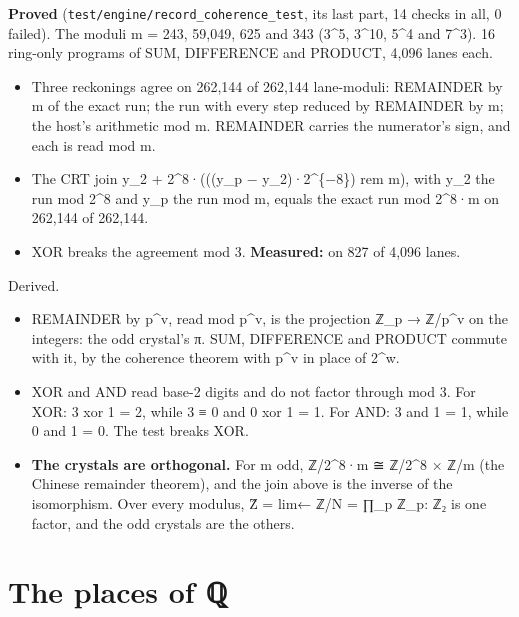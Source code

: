\textbf{Proved} (\texttt{test/\allowbreak{}engine/\allowbreak{}record\_\allowbreak{}coherence\_\allowbreak{}test}, its last part, 14 checks in all, 0 failed). The moduli m = 243, 59,049, 625 and 343 (3\textasciicircum{}5, 3\textasciicircum{}10, 5\textasciicircum{}4 and 7\textasciicircum{}3). 16 ring-only programs of SUM, DIFFERENCE and PRODUCT, 4,096 lanes each.

\begin{itemize}
\item Three reckonings agree on 262,144 of 262,144 lane-moduli: REMAINDER by m of the exact run; the run with every step reduced by REMAINDER by m; the host's arithmetic mod m. REMAINDER carries the numerator's sign, and each is read mod m.
\item The CRT join y\_\allowbreak{}2 + 2\textasciicircum{}8·(((y\_\allowbreak{}p − y\_\allowbreak{}2)·2\textasciicircum{}\{−8\}) rem m), with y\_\allowbreak{}2 the run mod 2\textasciicircum{}8 and y\_\allowbreak{}p the run mod m, equals the exact run mod 2\textasciicircum{}8·m on 262,144 of 262,144.
\item XOR breaks the agreement mod 3. \textbf{Measured:} on 827 of 4,096 lanes.
\end{itemize}

Derived.

\begin{itemize}
\item REMAINDER by p\textasciicircum{}v, read mod p\textasciicircum{}v, is the projection ℤ\_\allowbreak{}p → ℤ/p\textasciicircum{}v on the integers: the odd crystal's π. SUM, DIFFERENCE and PRODUCT commute with it, by the coherence theorem with p\textasciicircum{}v in place of 2\textasciicircum{}w.
\item XOR and AND read base-2 digits and do not factor through mod 3. For XOR: 3 xor 1 = 2, while 3 ≡ 0 and 0 xor 1 = 1. For AND: 3 and 1 = 1, while 0 and 1 = 0. The test breaks XOR.
\item \textbf{The crystals are orthogonal.} For m odd, ℤ/2\textasciicircum{}8·m ≅ ℤ/2\textasciicircum{}8 × ℤ/m (the Chinese remainder theorem), and the join above is the inverse of the isomorphism. Over every modulus, Ẑ = lim← ℤ/N = ∏\_\allowbreak{}p ℤ\_\allowbreak{}p: ℤ₂ is one factor, and the odd crystals are the others.
\end{itemize}

\section{\texorpdfstring{The places of ℚ}{The places of ℚ}}

